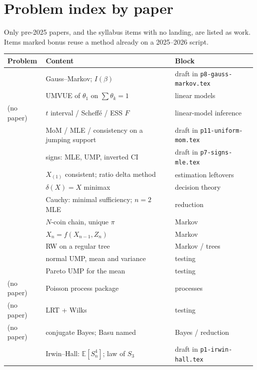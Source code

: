 \section{Problem index by paper}
\label{sec:index}

Only pre-2025 papers, and the syllabus items with no landing, are listed as work. Items marked bonus reuse a method already on a 2025--2026 script.

{\footnotesize
\begin{center}
\begin{tabular}{@{}L{2.6cm}L{6.2cm}L{5.4cm}@{}}
\toprule
Problem & Content & Block \\
\midrule
{} & Gauss--Markov; \(I(\beta)\) & draft in \texttt{p8-gauss-markov.tex} \\
 & UMVUE of \(\theta_{1}\) on \(\sum\theta_{k}=1\) & linear models \\
(no paper) & \(t\) interval / Scheff\'e / ESS \(F\) & linear-model inference \\
 & MoM / MLE / consistency on a jumping support & draft in \texttt{p11-uniform-mom.tex} \\
 & signs: MLE, UMP, inverted CI & draft in \texttt{p7-signs-mle.tex} \\
 & \(X_{(1)}\) consistent; ratio delta method & estimation leftovers \\
 & \(\delta(X)=X\) minimax & decision theory \\
 & Cauchy: minimal sufficiency; \(n=2\) MLE & reduction \\
 & \(N\)-coin chain, unique \(\pi\) & Markov \\
 & \(X_{n}=f(X_{n-1},Z_{n})\) & Markov \\
 & RW on a regular tree & Markov / trees \\
 & normal UMP, mean and variance & testing \\
 & Pareto UMP for the mean & testing \\
(no paper) & Poisson process package & processes \\
(no paper) & LRT + Wilks & testing \\
(no paper) & conjugate Bayes; Basu named & Bayes / reduction \\
 & Irwin--Hall: \(\mathbb{E}[S_{n}^{4}]\); law of \(S_{3}\) & draft in \texttt{p1-irwin-hall.tex} \\

\end{tabular}
\end{center}}

